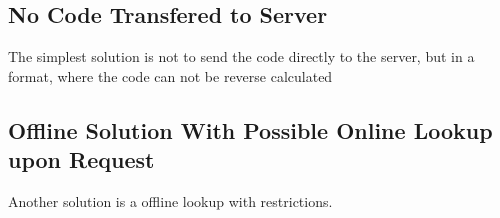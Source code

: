 \subsection{No Code Transfered to Server}
The simplest solution is not to send the code directly to the server, but in a format, where the code can not be reverse calculated

\subsection{Offline Solution With Possible Online Lookup upon Request}
Another solution is a offline lookup with restrictions.
